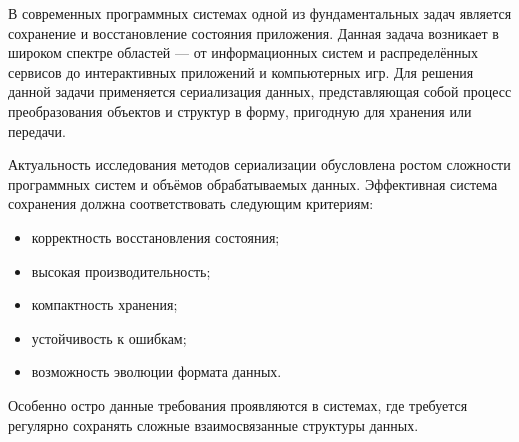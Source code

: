 \documentclass[coursework]{SCWorks}
\begin{document}

\date{2026}

\maketitle

\secNumbering

\tableofcontents





\intro

В современных программных системах одной из фундаментальных задач является сохранение и восстановление состояния приложения. Данная задача возникает в широком спектре областей --- от информационных систем и распределённых сервисов до интерактивных приложений и компьютерных игр. Для решения данной задачи применяется сериализация данных, представляющая собой процесс преобразования объектов и структур в форму, пригодную для хранения или передачи.

Актуальность исследования методов сериализации обусловлена ростом сложности программных систем и объёмов обрабатываемых данных. Эффективная система сохранения должна соответствовать следующим критериям:
\begin{itemize}
    \item корректность восстановления состояния;
    \item высокая производительность;
    \item компактность хранения;
    \item устойчивость к ошибкам;
    \item возможность эволюции формата данных.
\end{itemize}
Особенно остро данные требования проявляются в системах, где требуется регулярно сохранять сложные взаимосвязанные структуры данных.
\end{document}
